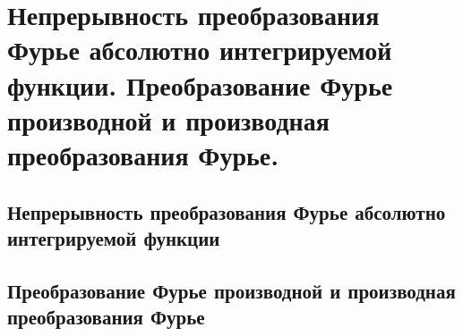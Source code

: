 \chapter{Непрерывность преобразования Фурье абсолютно интегрируемой функции. Преобразование Фурье производной и производная преобразования Фурье.}
\section{Непрерывность преобразования Фурье абсолютно интегрируемой функции}
\section{Преобразование Фурье производной и производная преобразования Фурье}